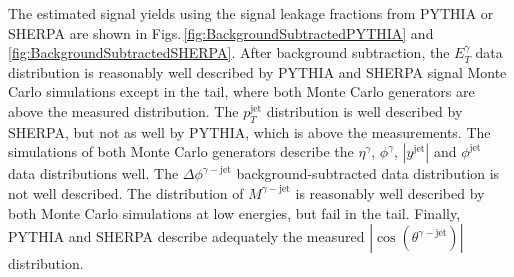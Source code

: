 \documentclass[12pt, twoside]{article}
\numberwithin{equation}{section}
\numberwithin{figure}{section}
\begin{document}
The estimated signal yields using the signal leakage fractions from PYTHIA or SHERPA are shown in Figs.\,\ref{fig:BackgroundSubtractedPYTHIA} and \ref{fig:BackgroundSubtractedSHERPA}. After background subtraction, the $E^{\gamma}_{T}$ data distribution is reasonably well described by PYTHIA and SHERPA signal Monte Carlo simulations except in the tail, where both Monte Carlo generators are above the measured distribution. The $p^{\text{jet}}_{T}$ distribution is well described by SHERPA, but not as well by PYTHIA, which is above the measurements. The simulations of both Monte Carlo generators describe the $\eta^{\gamma}$, $\phi^{\gamma}$, $\left| y^{\text{jet}} \right|$ and $\phi^{\text{jet}}$ data distributions well. The $\Delta \phi^{\gamma-\text{jet}}$ background-subtracted data distribution is not well described. The distribution of $M^{\gamma-\text{jet}}$ is reasonably well described by both Monte Carlo simulations at low energies, but fail in the tail. Finally, PYTHIA and SHERPA describe adequately the measured $\left| \cos \left( \theta^{\gamma-\text{jet}} \right) \right|$ distribution.
\end{document}
